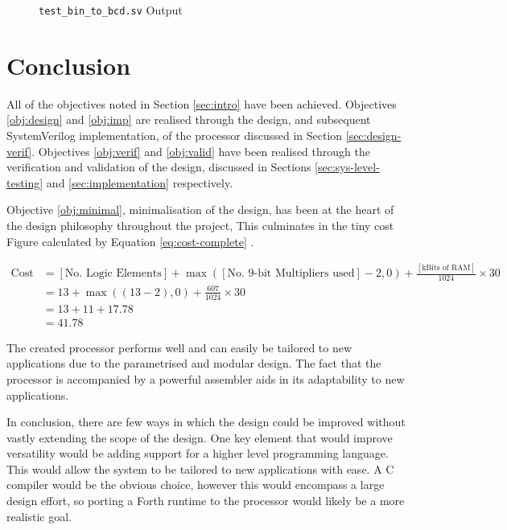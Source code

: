 

\begin{figure}[ht]
	\centering
	
	\caption{\texttt{test\_bin\_to\_bcd.sv} Output}
	\label{fig:test-bin-bcd}
\end{figure}

\FloatBarrier
\section{Conclusion}
All of the objectives noted in Section \ref{sec:intro} have been achieved. Objectives \ref{obj:design} and \ref{obj:imp} are realised through the design, and subsequent SystemVerilog implementation, of the processor discussed in Section \ref{sec:design-verif}. Objectives \ref{obj:verif} and \ref{obj:valid} have been realised through the verification and validation of the design, discussed in Sections \ref{sec:sys-level-testing} and \ref{sec:implementation} respectively.

Objective \ref{obj:minimal}, minimalisation of the design, has been at the heart of the design philosophy throughout the project, This culminates in the tiny cost Figure calculated by Equation \ref{eq:cost-complete} \cite{kazmierski2017}.

\begin{align}
\text{Cost} &= [\text{No. Logic Elements}] + \max([\text{No. 9-bit Multipliers used}] -2, 0) + \frac{ [\text{kBits of RAM}]}{1024} \times 30 \nonumber \\
&= 13 +  \max((13-2), 0) + \frac{607}{1024} \times 30  \nonumber \\
&= 13 + 11 + 17.78  \nonumber \\
&= 41.78
\label{eq:cost-complete}
\end{align}

The created processor performs well and can easily be tailored to new applications due to the parametrised and modular design. The fact that the processor is accompanied by a powerful assembler aids in its adaptability to new applications.

In conclusion, there are few ways in which the design could be improved without vastly extending the scope of the design. One key element that would improve versatility would be adding support for a higher level programming language. This would allow the system to be tailored to new applications with ease. A C compiler would be the obvious choice, however this would encompass a large design effort, so porting a Forth runtime to the processor would likely be a more realistic goal.

